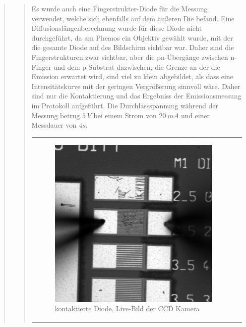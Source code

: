 \begin{quote}
\begin{quote}
        Es wurde auch eine Fingerstrukter-Diode für die Messung verwendet,
        welche sich ebenfalls auf dem äußeren Die befand. Eine
        Diffusionslängenberechnung wurde für diese Diode nicht durchgeführt, da
        am Phemos ein Objektiv gewählt wurde, mit der die gesamte Diode auf des
        Bildschirm sichtbar war. Daher sind die Fingerstrukturen zwar sichtbar,
        aber die pn-Übergänge zwischen n-Finger und dem p-Substrat dazwischen,
        die Grenze an der die Emission erwartet wird, sind viel zu klein
        abgebildet, als dass eine Intensitätskurve mit der geringen Vergrößerung
        sinnvoll wäre. Daher sind nur die Kontaktierung und das Ergebniss der
        Emissionsmessung im Protokoll aufgeführt. Die Durchlassspannung während
        der Messung betrug $5\ V$ bei einem Strom von $20\ mA$ und einer
        Messdauer von $4s$.


            \begin{center}
                \begin{tabular}{ll}

                \hspace{-10em}
                    \begin{minipage}{0.6\textwidth}

                        \begin{figure}[H]
                            \label{fig:nbmkhjuk}
                            \includegraphics[scale=0.25, trim = 0cm 0cm 0cm
                            0cm,
                            clip]{./Emissionsbilder/fuenf/nach_Kontaktierung.jpg}
                            \caption{kontaktierte Diode, Live-Bild der CCD
                            Kamera}
                        \end{figure}


\end{minipage}
\end{tabular}
\end{center}
\end{quote}
\end{quote}
